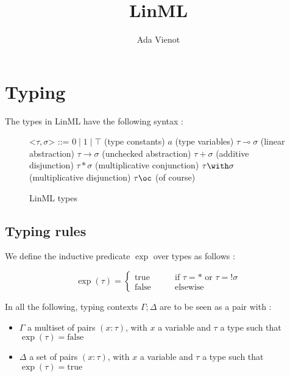 \documentclass{article}
\begin{document}
\title{LinML}
\author{Ada Vienot}
\date{}

\maketitle

\section{Typing}

The types in LinML have the following syntax :

\begin{figure}[!h]
    \centering
    \begin{minipage}{0.7\linewidth}
        \setlength{\grammarindent}{3.8em}
        \begin{grammar}
            \let\syntleft\relax
            \let\syntright\relax
            <$\tau, \sigma$> ::= 
                $0 \mid 1 \mid \top$ \hfill (type constants)
                \alt $a$ \hfill (type variables)
                \alt $\tau \multimap \sigma$ \hfill (linear abstraction)
                \alt $\tau \to \sigma$ \hfill (unchecked abstraction)
                \alt $\tau + \sigma$ \hfill (additive disjunction)
                \alt $\tau * \sigma$ \hfill (multiplicative conjunction)
                \alt $\tau \with \sigma$ \hfill (multiplicative disjunction)
                \alt $\tau \oc$ \hfill (of course)
        \end{grammar}
    \end{minipage}
    \caption{LinML types}
    \label{types}
\end{figure}

\subsection{Typing rules}

We define the inductive predicate $\operatorname{exp}$ over types as follows :

$$
\operatorname{exp}(\tau) = 
\left \{
\begin{aligned}
    \mathrm{true} \qquad &\text{if } \tau = * \text{ or } \tau = !\sigma\\
    \mathrm{false} \qquad &\text{elsewise}
\end{aligned}
\right.
$$

In all the following, typing contexts $\Gamma ; \Delta$ are to be seen as a pair with :
\begin{itemize}
    \item $\Gamma$ a multiset of pairs $(x : \tau)$, with $x$ a variable and $\tau$ a type such that $\operatorname{exp}(\tau) = \mathrm{false}$
    
    \item $\Delta$ a set of pairs $(x : \tau)$, with $x$ a variable and $\tau$ a type such that $\operatorname{exp}(\tau) = \mathrm{true}$    
\end{itemize}
\end{document}
